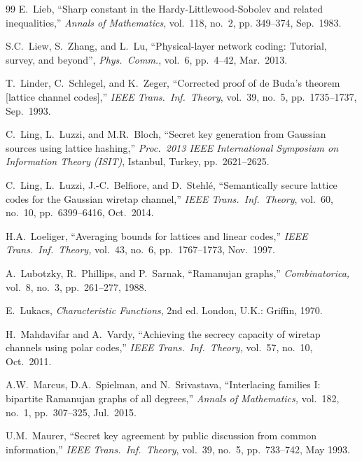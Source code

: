 \documentclass[main.tex]{subfiles}
\begin{document}
\begin{thebibliography}{99}
  E.\ Lieb, ``Sharp constant in the Hardy-Littlewood-Sobolev and related inequalities,'' \emph{Annals of
 Mathematics}, vol.\ 118, no.\ 2, pp. 349--374, Sep.\ 1983.

 S.C.\ Liew, S.\ Zhang, and L.\ Lu, ``Physical-layer network coding: Tutorial, survey, and beyond'', \emph{Phys.\ Comm.}, vol.\ 6, pp.\ 4--42, Mar.\ 2013.
 
T.~Linder, C.~Schlegel, and K.~Zeger, ``Corrected proof of de
Buda's theorem [lattice channel codes],'' 
\emph{IEEE Trans.\ Inf.\ Theory}, vol.\ 39, no.\ 5, pp.\ 1735--1737, Sep.\ 1993.

 C.\ Ling, L.\ Luzzi, and M.R.\ Bloch, ``Secret key generation from Gaussian sources using lattice hashing,'' 
 \emph{Proc.\ 2013 IEEE International Symposium on Information Theory (ISIT)}, Istanbul, Turkey, pp.\ 2621--2625.

 C.\ Ling, L.\ Luzzi, J.-C.\ Belfiore, and D.\ Stehl{\'e}, 
``Semantically secure lattice codes for the Gaussian wiretap channel,''
\emph{IEEE Trans.\ Inf.\ Theory}, vol.\ 60, no.\ 10, pp.\ 6399--6416, Oct.\ 2014.

H.A.\ Loeliger, ``Averaging bounds for lattices and linear codes,'' \emph{IEEE Trans.\ Inf.\ Theory,} vol.\ 43, no.\ 6, pp.\ 1767--1773, Nov.\ 1997.

A.\ Lubotzky, R.\ Phillips, and P.\ Sarnak, ``Ramanujan graphs,'' \emph{Combinatorica,} vol.\ 8, no.\ 3, pp.\ 261--277, 1988.

 E.~Lukacs, \emph{Characteristic Functions}, 2nd ed. London, U.K.: Griffin, 1970.

H.\ Mahdavifar and A.\ Vardy, ``Achieving the secrecy capacity of wiretap
channels using polar codes,'' \emph{IEEE Trans.\ Inf.\ Theory,} vol.\ 57, no.\ 10, Oct.\ 2011.

A.W.\ Marcus, D.A.\ Spielman, and N.\ Srivastava, ``Interlacing families I: bipartite Ramanujan graphs of all degrees,'' \emph{Annals of Mathematics,} vol.\ 182, no.\ 1, pp.\ 307--325, Jul.\ 2015.	

U.M.\ Maurer, ``Secret key agreement by public discussion from
common information,'' \emph{IEEE Trans.\ Inf.\ Theory}, vol.\ 39, no.\ 5, pp.\
733--742, May 1993.


\end{thebibliography}
\end{document}
